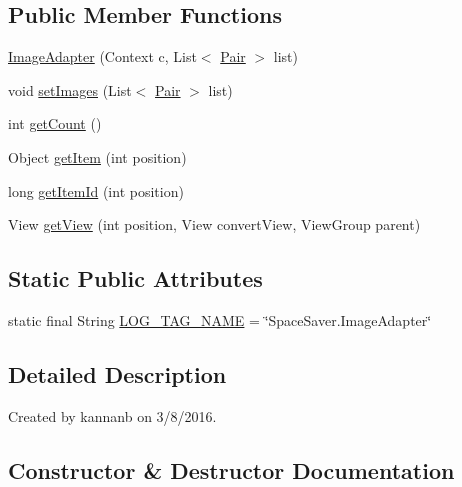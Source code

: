 \subsection*{Public Member Functions}
\begin{DoxyCompactItemize}
\item 
\hyperlink{classcourse_1_1examples_1_1spacesaver_1_1_image_adapter_a4a64ff6f4afb032a7b909d452da4d0f7}{Image\+Adapter} (Context c, List$<$ \hyperlink{classcourse_1_1examples_1_1spacesaver_1_1_pair}{Pair} $>$ list)
\item 
void \hyperlink{classcourse_1_1examples_1_1spacesaver_1_1_image_adapter_a1bc7a805204d8065aaddc2ad1b0c4a1e}{set\+Images} (List$<$ \hyperlink{classcourse_1_1examples_1_1spacesaver_1_1_pair}{Pair} $>$ list)
\item 
int \hyperlink{classcourse_1_1examples_1_1spacesaver_1_1_image_adapter_a7446ece5dd5f5c4f4afeb7a19cdb8728}{get\+Count} ()
\item 
Object \hyperlink{classcourse_1_1examples_1_1spacesaver_1_1_image_adapter_a2011762c7b8bd44e291c1d75ca223581}{get\+Item} (int position)
\item 
long \hyperlink{classcourse_1_1examples_1_1spacesaver_1_1_image_adapter_a54e7407f7a3d8e2e18513e8826ee861e}{get\+Item\+Id} (int position)
\item 
View \hyperlink{classcourse_1_1examples_1_1spacesaver_1_1_image_adapter_a4072f1ec52b57c428c4c85261be15986}{get\+View} (int position, View convert\+View, View\+Group parent)
\end{DoxyCompactItemize}
\subsection*{Static Public Attributes}
\begin{DoxyCompactItemize}
\item 
static final String \hyperlink{classcourse_1_1examples_1_1spacesaver_1_1_image_adapter_a6cf088221e1ed475f35d61db7ff3f4a4}{L\+O\+G\+\_\+\+T\+A\+G\+\_\+\+N\+A\+M\+E} = \char`\"{}Space\+Saver.\+Image\+Adapter\char`\"{}
\end{DoxyCompactItemize}


\subsection{Detailed Description}
Created by kannanb on 3/8/2016. 

\subsection{Constructor \& Destructor Documentation}
\hypertarget{classcourse_1_1examples_1_1spacesaver_1_1_image_adapter_a4a64ff6f4afb032a7b909d452da4d0f7}{}
